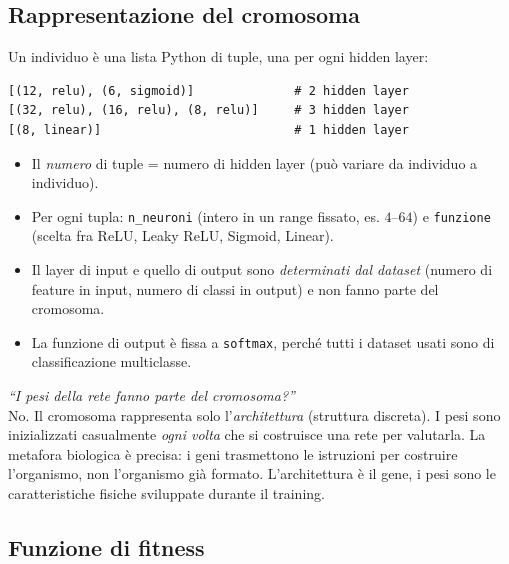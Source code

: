 \documentclass[11pt,a4paper]{article}
\newcommand{\fnt}{\texttt}     %
\begin{document}
\subsection{Rappresentazione del cromosoma}

Un individuo è una lista Python di tuple, una per ogni hidden layer:

\begin{verbatim}
[(12, relu), (6, sigmoid)]              # 2 hidden layer
[(32, relu), (16, relu), (8, relu)]     # 3 hidden layer
[(8, linear)]                           # 1 hidden layer
\end{verbatim}

\begin{itemize}
    \item Il \emph{numero} di tuple = numero di hidden layer (può variare
          da individuo a individuo).
    \item Per ogni tupla: \texttt{n\_neuroni} (intero in un range fissato,
          es. $4$--$64$) e \texttt{funzione} (scelta fra ReLU, Leaky ReLU,
          Sigmoid, Linear).
    \item Il layer di input e quello di output sono \emph{determinati dal
          dataset} (numero di feature in input, numero di classi in
          output) e non fanno parte del cromosoma.
    \item La funzione di output è fissa a \fnt{softmax}, perché tutti i
          dataset usati sono di classificazione multiclasse.
\end{itemize}

\begin{domanda}
\textit{``I pesi della rete fanno parte del cromosoma?''}\\
No. Il cromosoma rappresenta solo l'\emph{architettura} (struttura
discreta). I pesi sono inizializzati casualmente \emph{ogni volta} che si
costruisce una rete per valutarla. La metafora biologica è precisa: i
geni trasmettono le istruzioni per costruire l'organismo, non l'organismo
già formato. L'architettura è il gene, i pesi sono le caratteristiche
fisiche sviluppate durante il training.
\end{domanda}

\subsection{Funzione di fitness}
\end{document}
